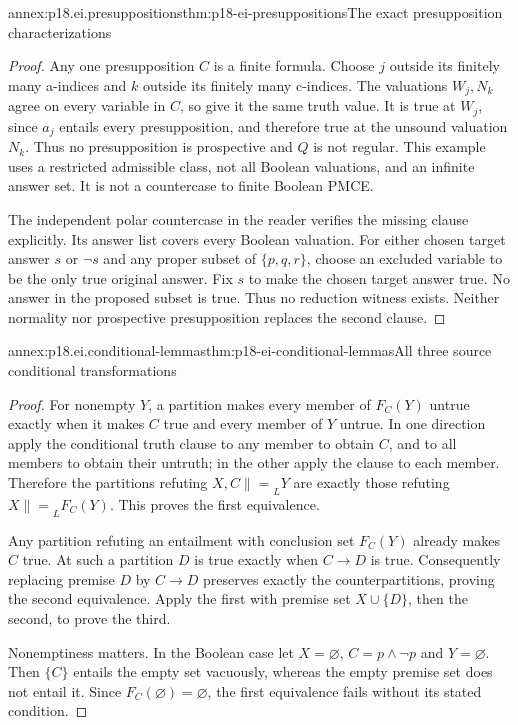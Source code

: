 \begin{annexitem}{annex:p18.ei.presuppositions}{thm:p18-ei-presuppositions}{The exact presupposition characterizations}
\begin{proof}
Any one presupposition \(C\) is a finite formula. Choose \(j\) outside
its finitely many a-indices and \(k\) outside its finitely many c-indices.
The valuations \(W_j,N_k\) agree on every variable in \(C\), so give it
the same truth value. It is true at \(W_j\), since \(a_j\) entails every
presupposition, and therefore true at the unsound valuation \(N_k\).
Thus no presupposition is prospective and \(Q\) is not regular. This
example uses a restricted admissible class, not all Boolean valuations,
and an infinite answer set. It is not a countercase to finite Boolean PMCE.

The independent polar countercase in the reader verifies the missing clause
explicitly. Its answer list covers every Boolean valuation. For either chosen
target answer \(s\) or \(\neg s\) and any proper subset of \(\{p,q,r\}\),
choose an excluded variable to be the only true original answer. Fix \(s\)
to make the chosen target answer true. No answer in the proposed subset is
true. Thus no reduction witness exists. Neither normality nor prospective
presupposition replaces the second clause.
\end{proof}
\end{annexitem}

\begin{annexitem}{annex:p18.ei.conditional-lemmas}{thm:p18-ei-conditional-lemmas}{All three source conditional transformations}
\begin{proof}
For nonempty \(Y\), a partition makes every member of \(F_C(Y)\)
untrue exactly when it makes \(C\) true and every member of \(Y\) untrue.
In one direction apply the conditional truth clause to any member to obtain
\(C\), and to all members to obtain their untruth; in the other apply the
clause to each member. Therefore the partitions refuting
\(X,C\mathrel{\|=}_L Y\) are exactly those refuting
\(X\mathrel{\|=}_L F_C(Y)\). This proves the first equivalence.

Any partition refuting an entailment with conclusion set \(F_C(Y)\)
already makes \(C\) true. At such a partition \(D\) is true exactly when
\(C\to D\) is true. Consequently replacing premise \(D\) by
\(C\to D\) preserves exactly the counterpartitions, proving the second
equivalence. Apply the first with premise set \(X\cup\{D\}\), then
the second, to prove the third.

Nonemptiness matters. In the Boolean case let \(X=\varnothing\),
\(C=p\land\neg p\) and \(Y=\varnothing\). Then \(\{C\}\) entails
the empty set vacuously, whereas the empty premise set does not entail it.
Since \(F_C(\varnothing)=\varnothing\), the first equivalence fails
without its stated condition.
\end{proof}
\end{annexitem}

